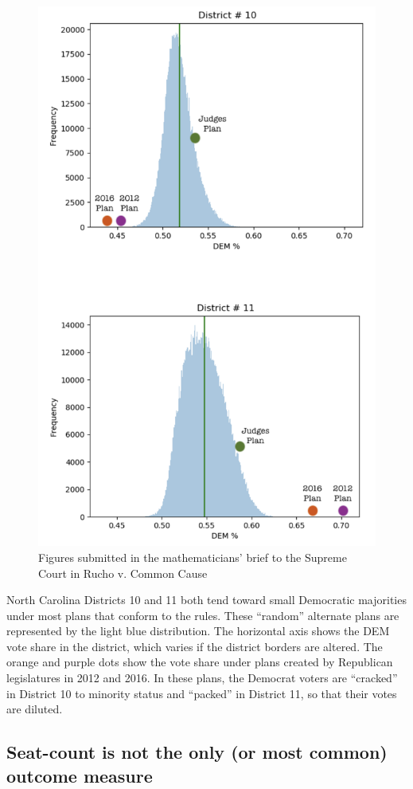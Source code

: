\documentclass[
  openany]{book}
\begin{document}
\begin{figure}

{\centering \includegraphics[width=0.7\linewidth]{images/amicus_NCdist} 

}

\caption{Figures submitted in the mathematicians' brief to the Supreme Court in Rucho v. Common Cause}\label{fig:amicus-NC}
\end{figure}

North Carolina Districts 10 and 11 both tend toward small Democratic majorities under most plans that conform to the rules. These ``random'' alternate plans are represented by the light blue distribution. The horizontal axis shows the DEM vote share in the district, which varies if the district borders are altered. The orange and purple dots show the vote share under plans created by Republican legislatures in 2012 and 2016. In these plans, the Democrat voters are ``cracked'' in District 10 to minority status and ``packed'' in District 11, so that their votes are diluted.

\hypertarget{seat-count-is-not-the-only-or-most-common-outcome-measure}{%
\subsection*{Seat-count is not the only (or most common) outcome measure}\label{seat-count-is-not-the-only-or-most-common-outcome-measure}}
\end{document}
